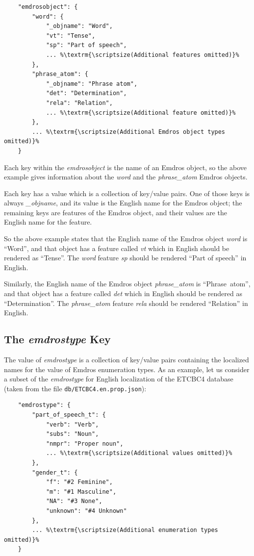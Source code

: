 \documentclass[11pt,oneside,a4paper]{memoir}
\begin{document}
\begin{lstlisting}
    "emdrosobject": {
        "word": {
            "_objname": "Word",
            "vt": "Tense",
            "sp": "Part of speech",
            ... %\textrm{\scriptsize(Additional features omitted)}%
        },
        "phrase_atom": {
            "_objname": "Phrase atom",
            "det": "Determination",
            "rela": "Relation",
            ... %\textrm{\scriptsize(Additional feature omitted)}%
        },
        ... %\textrm{\scriptsize(Additional Emdros object types omitted)}%
    }
\end{lstlisting}


Each key within the \emph{emdrosobject} is the name of an Emdros object, so the above example gives
information about the \emph{word} and the \emph{phrase\_atom} Emdros objects.

Each key has a value which is a collection of key/value pairs. One of those keys is always
\emph{\_objname}, and its value is the English name for the Emdros object; the remaining keys are
features of the Emdros object, and their values are the English name for the feature.

So the above example states that the English name of the Emdros object \emph{word} is ``Word'', and
that object has a feature called \emph{vt} which in English should be rendered as
``Tense''. The \emph{word} feature \emph{sp} should be rendered
``Part of speech'' in English.

Similarly, the English name of the Emdros object \emph{phrase\_atom} is ``Phrase~atom'', and
that object has a feature called \emph{det} which in English should be rendered as
``Determination''. The \emph{phrase\_atom} feature \emph{rela} should be rendered
``Relation'' in English.


\subsection{The \emph{emdrostype} Key}\label{enum-loc}

The value of \emph{emdrostype} is a collection of key/value pairs containing the localized names for
the value of Emdros enumeration types. As an example, let us consider a subset of the
\emph{emdrostype} for English localization of the ETCBC4 database (taken from the file
\texttt{db/ETCBC4.en.prop.json}):

\begin{lstlisting}
    "emdrostype": {
        "part_of_speech_t": {
            "verb": "Verb",
            "subs": "Noun",
            "nmpr": "Proper noun",
            ... %\textrm{\scriptsize(Additional values omitted)}%
        },
        "gender_t": {
            "f": "#2 Feminine",
            "m": "#1 Masculine",
            "NA": "#3 None",
            "unknown": "#4 Unknown"
        },
        ... %\textrm{\scriptsize(Additional enumeration types omitted)}%
    }
\end{lstlisting}
\end{document}
